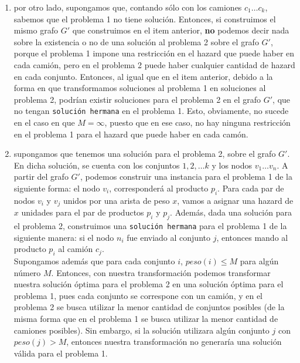 \documentclass[11pt, a4paper, twoside]{article}
\begin{document}
\begin{enumerate}
\begin{enumerate}
			      \item por otro lado, supongamos que, contando sólo con los camiones $c_{1} \dots c_{k}$, sabemos
			      que el problema 1 no tiene solución. Entonces, si construimos el mismo grafo $G'$ que construimos
			      en el item anterior, \textbf{no} podemos decir nada sobre la existencia o no de una solución
			      al problema 2 sobre el grafo $G'$, porque el problema 1 impone una restricción en el hazard que
			      puede haber en cada camión, pero en el problema 2 puede haber cualquier cantidad de hazard en cada
			      conjunto. Entonces, al igual que en el item anterior, debido a la forma en que transformamos soluciones
			      al problema 1 en soluciones al problema 2, podrían existir soluciones para el problema 2
			      en el grafo $G'$, que no tengan \texttt{solución hermana} en el problema 1. Esto, obviamente, no sucede
			      en el caso en que $M = \infty$, puesto que en ese caso, no hay ninguna restricción en el problema 1
			      para el hazard que puede haber en cada camón. 
			      
			      \item supongamos que tenemos una solución para el problema 2, sobre el grafo $G'$. En dicha 
			      solución, se cuenta con
			      los conjuntos $1, 2, \dots k$ y los nodos $v_{1} \dots v_{n}$. A partir del grafo $G'$, podemos
			      construir una instancia para el problema 1 de la siguiente forma: el nodo $v_{i}$, corresponderá
			      al producto $p_{i}$. Para cada par de nodos $v_{i}$ y $v_{j}$ unidos por una arista de peso $x$,
			      vamos a asignar una hazard de $x$ unidades para el par de productos $p_{i}$ y $p_{j}$. Además,
			      dada una solución para el problema 2, construimos una \texttt{solución hermana} para el problema 1
			      de la siguiente manera: si el nodo $n_{i}$ fue enviado al conjunto $j$, entonces mando al producto
			      $p_{i}$ al camión $c_{j}$. \\
			      Supongamos además que para cada conjunto $i$, $peso(i) \leq M$ para algún número $M$. Entonces, 
			      con nuestra transformación podemos transformar nuestra solución óptima para el problema 2 en una solución
			      óptima para el problema 1, pues cada conjunto se correspone con un camión, y en el problema 2 se busca
			      utilizar la menor cantidad de conjuntos posibles (de la misma forma que en el problema 1 se busca
			      utilizar la menor cantidad de camiones posibles). Sin embargo, si la solución utilizara algún
			      conjunto $j$ con $peso(j) > M$, entonces
			      nuestra transformación no generaría una solución válida para el problema 1.
			  \end{enumerate}
		

\end{enumerate}
\end{document}
